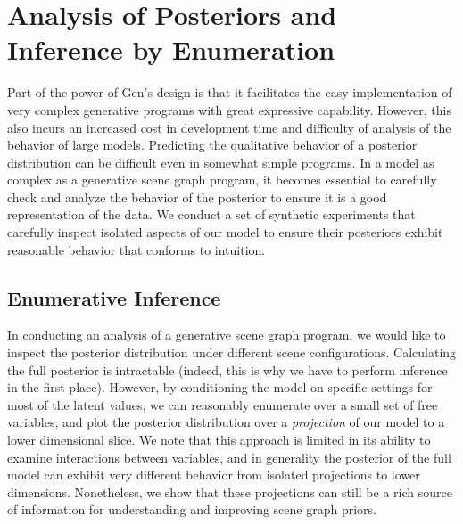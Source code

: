 \chapter{Analysis of Posteriors and Inference by Enumeration}

Part of the power of Gen's design is that it facilitates the easy implementation of very complex generative programs with great expressive capability.
However, this also incurs an increased cost in development time and difficulty of analysis of the behavior of large models.
Predicting the qualitative behavior of a posterior distribution can be difficult even in somewhat simple programs.
In a model as complex as a generative scene graph program, it becomes essential to carefully check and analyze the behavior of the posterior to ensure it is a good representation of the data.
We conduct a set of synthetic experiments that carefully inspect isolated aspects of our model to ensure their posteriors exhibit reasonable behavior that conforms to intuition.

\section{Enumerative Inference}
In conducting an analysis of a generative scene graph program, we would like to inspect the posterior distribution under different scene configurations.
Calculating the full posterior is intractable (indeed, this is why we have to perform inference in the first place).
However, by conditioning the model on specific settings for most of the latent values, we can reasonably enumerate over a small set of free variables, and plot the posterior distribution over a \textit{projection} of our model to a lower dimensional slice.
We note that this approach is limited in its ability to examine interactions between variables, and in generality the posterior of the full model can exhibit very different behavior from isolated projections to lower dimensions.
Nonetheless, we show that these projections can still be a rich source of information for understanding and improving scene graph priors.

